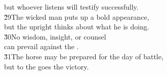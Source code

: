 \begin{poetry}
\poemll    but whoever listens will testify successfully. \\
\poeml \v{29}The wicked man puts up a bold appearance, \\
\poemll    but the upright thinks about what he is doing. \\
\poeml \v{30}No wisdom, insight, or counsel \\
\poemll    can prevail against the . \\
\poeml \v{31}The horse may be prepared for the day of battle, \\
\poemll    but to the  goes the victory.
\end{poetry}


